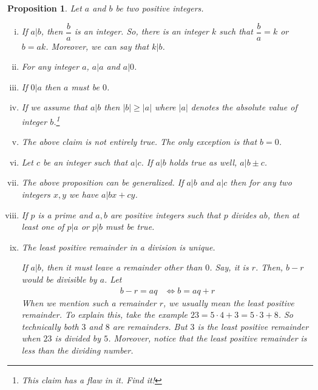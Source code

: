 \documentclass[a4paper, 12pt, leqno]{article}
\newtheorem{proposition}{Proposition}
\theoremstyle{definition}
\theoremstyle{remark}
\begin{document}
		\begin{proposition}
			Let $a$ and $b$ be two positive integers.
				\begin{enumerate}[i.]
					\item If $a|b$, then $\dfrac{b}{a}$ is an integer. So, there is an integer $k$ such that $\dfrac{b}{a}=k$ or $b=ak$. Moreover, we can say that $k|b$.
					\item For any integer $a$, $a|a$ and $a|0$.
					\item If $0|a$ then $a$ must be $0$.
					\item If we assume that $a|b$ then $|b|\geq |a|$ where $|a|$ denotes the absolute value of integer $b$.\footnote{This claim has a flaw in it. Find it!}
					\item The above claim is not entirely true. The only exception is that $b=0$.
					\item Let $c$ be an integer such that $a|c$. If $a|b$ holds true as well, $a|b\pm c$.
					\item The above proposition can be generalized. If $a|b$ and $a|c$ then for any two integers $x,y$ we have $a|bx+cy$.
					\item[Euclid's Lemma] If $p$ is a prime and $a,b$ are positive integers such that $p$ divides $ab$, then at least one of $p|a$ or $p|b$ must be true.
					\item The least positive remainder in a division is unique.
					
					If $a|b$, then it must leave a remainder other than $0$. Say, it is $r$. Then, $b-r$ would be divisible by $a$. Let
						\begin{align*}
							b-r=aq & \iff b=aq+r
						\end{align*}
					When we mention such a remainder $r$, we usually mean the least positive remainder. To explain this, take the example $23=5\cdot4+3=5\cdot3+8$. So technically both $3$ and $8$ are remainders. But $3$ is the least positive remainder when $23$ is divided by $5$. Moreover, notice that the least positive remainder is less than the dividing number.
					

\end{enumerate}
\end{proposition}
\end{document}
